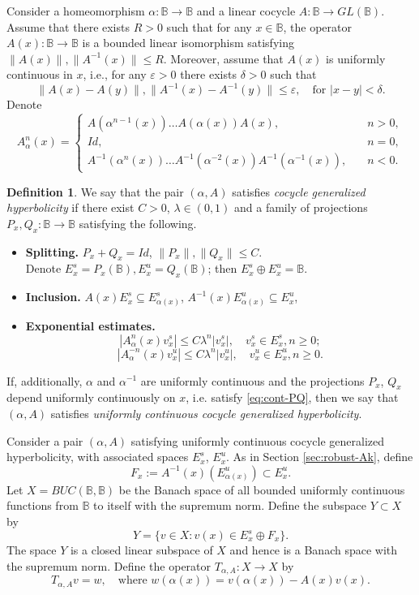 \documentclass[12pt]{article}
\newcommand{\Bb}{\mathbb{B}}
\theoremstyle{definition}
\newtheorem{defin}[thm]{Definition}
\begin{document}
Consider a homeomorphism $\alpha: \Bb \to \Bb$ and a linear cocycle $A:\Bb \to GL(\Bb)$. Assume that there exists $R > 0$ such that for any $x \in \Bb$, the operator $A(x):\Bb \to \Bb$ is a bounded linear isomorphism satisfying 
$
\|A(x)\|, \|A^{-1}(x)\| \leq R
$.
Moreover, assume that $A(x)$ is uniformly continuous in $x$, i.e., for any $\varepsilon > 0$ there exists $\delta > 0$ such that
$$
\|A(x) - A(y)\|, \|A^{-1}(x) - A^{-1}(y)\|\leq \varepsilon, \quad \mbox{for $|x-y| < \delta$}.
$$
Denote
$$
A^n_{\alpha}(x) = \begin{cases}
A(\alpha^{n-1}(x))\dots A(\alpha(x))A(x), & \quad n >0,\\
Id, &\quad n = 0,\\
A^{-1}(\alpha^{n}(x)) \dots A^{-1}(\alpha^{-2}(x))A^{-1}(\alpha^{-1}(x)), & \quad n < 0.
\end{cases}
$$

\begin{defin}\label{def:CL-cocycle}
    We say that the pair $(\alpha, A)$ satisfies \textit{cocycle generalized hyperbolicity} if there exist $C > 0$, $\lambda \in (0, 1)$ and a family of projections $P_x, Q_x: \Bb \to \Bb$ satisfying the following. 
\begin{itemize}
    \item[(C-GH1)] \textbf{Splitting.} $P_x + Q_x = Id$, $\|P_x\|, \|Q_x\| \leq C$. \\Denote $E^s_x = P_x(\Bb), E^u_x = Q_x(\Bb)$; then $E^s_x \oplus E^u_x = \Bb$.
    \item[(C-GH2)] \textbf{Inclusion.} $A(x)E^s_x \subseteq E^s_{\alpha(x)}$, $A^{-1}(x)E^u_{\alpha(x)} \subseteq E^u_{x}$,
    \item[(C-GH3)] \textbf{Exponential estimates.}
    $$
    |A^n_{\alpha}(x)v^s_x| \leq C \lambda^n |v^s_x|, \quad v^s_x \in E^s_x, n  \geq 0;
    $$
    $$
    |A^{-n}_{\alpha}(x)v^u_x| \leq C \lambda^n |v^u_x|, \quad v^u_x \in E^u_x, n  \geq 0.
    $$
\end{itemize}
If, additionally, $\alpha$ and $\alpha^{-1}$ are uniformly continuous and the projections $P_x$, $Q_x$ depend uniformly continuously on $x$, i.e. satisfy \eqref{eq:cont-PQ}, then we say that $(\alpha,A)$ satisfies \textit{uniformly continuous cocycle generalized hyperbolicity}.
\end{defin}

Consider a pair $(\alpha, A)$ satisfying uniformly continuous cocycle generalized hyperbolicity, with associated spaces $E^s_x$, $E^u_x$. As in Section \ref{sec:robust-Ak}, define
$$
F_x := A^{-1}(x)(E_{\alpha(x)}^u) \subset E_x^u.
$$
Let $X = BUC(\Bb, \Bb)$ be the Banach space of all bounded uniformly continuous functions from $\Bb$ to itself with the supremum norm. 
Define the subspace $Y \subset X$ by
$$
Y = \{v \in X: v(x) \in E_x^s \oplus F_x\}.
$$
The space $Y$ is a closed linear subspace of $X$ and hence is a Banach space with the supremum norm.
Define the operator $T_{\alpha, A}: X \to X$ by
\begin{equation}\label{eq:Twv}
T_{\alpha, A} v = w, \quad \mbox{where $w(\alpha(x)) = v(\alpha(x)) - A(x)v(x)$}.    
\end{equation}
\end{document}
